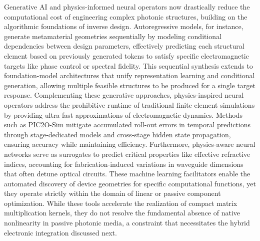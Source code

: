 Generative AI and physics-informed neural operators now drastically reduce the computational cost of engineering complex photonic structures, building on the algorithmic foundations of inverse design. Autoregressive models, for instance, generate metamaterial geometries sequentially by modeling conditional dependencies between design parameters, effectively predicting each structural element based on previously generated tokens to satisfy specific electromagnetic targets like phase control or spectral fidelity. \citep{doi_10_48550_arxiv_2507_06853_b7161f49} This sequential synthesis extends to foundation-model architectures that unify representation learning and conditional generation, allowing multiple feasible structures to be produced for a single target response. Complementing these generative approaches, physics-inspired neural operators address the prohibitive runtime of traditional finite element simulations by providing ultra-fast approximations of electromagnetic dynamics. \citep{doi_10_1016_j_compositesb_2025_112935_31ebab19} Methods such as PIC2O-Sim mitigate accumulated roll-out errors in temporal predictions through stage-dedicated models and cross-stage hidden state propagation, ensuring accuracy while maintaining efficiency. \citep{doi_10_48550_arxiv_2406_17810_813bd2a3} Furthermore, physics-aware neural networks serve as surrogates to predict critical properties like effective refractive indices, accounting for fabrication-induced variations in waveguide dimensions that often detune optical circuits. \citep{doi_10_1007_s11082_024_08009_8_0f7f241e} These machine learning facilitators enable the automated discovery of device geometries for specific computational functions, yet they operate strictly within the domain of linear or passive component optimization. While these tools accelerate the realization of compact matrix multiplication kernels, they do not resolve the fundamental absence of native nonlinearity in passive photonic media, a constraint that necessitates the hybrid electronic integration discussed next. \citep{doi_10_1109_access_2026_3697666_bd5258a6} \citep{doi_10_48550_arxiv_2406_17810_813bd2a3} \citep{doi_10_1007_s11082_024_08009_8_0f7f241e} \citep{doi_10_1063_5_0159264_6f483b1f}

